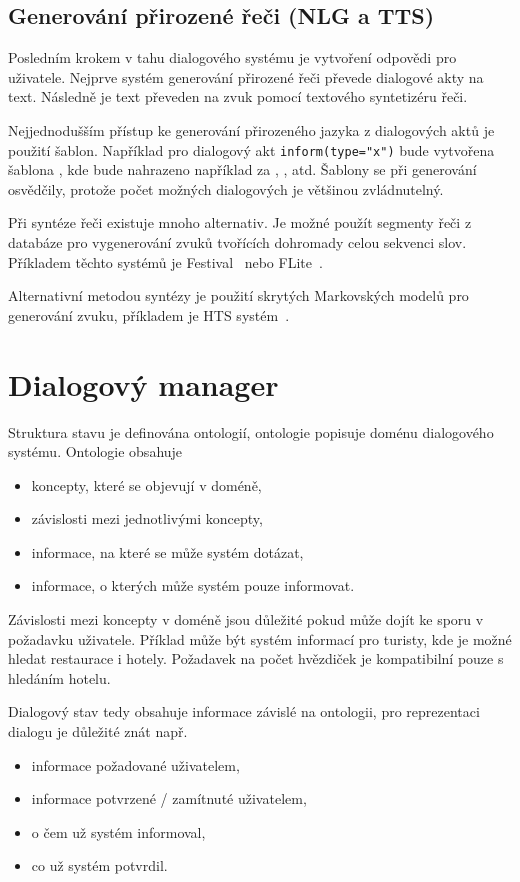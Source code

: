 \subsection{Generování přirozené řeči (NLG a TTS)}

Posledním krokem v tahu dialogového systému je vytvoření odpovědi pro uživatele. 
Nejprve systém generování přirozené řeči převede dialogové akty na text. 
Následně je text převeden na zvuk pomocí textového syntetizéru řeči.

Nejjednodušším přístup ke generování přirozeného jazyka z dialogových aktů je použití šablon.
Například pro dialogový akt {\tt inform(type="x")} bude vytvořena šablona , kde  bude nahrazeno například za , , atd. 
Šablony se při generování osvědčily, protože počet možných dialogových je většinou zvládnutelný.

Při syntéze řeči existuje mnoho alternativ. 
Je možné použít segmenty řeči z databáze pro vygenerování zvuků tvořících dohromady celou sekvenci slov.
Příkladem těchto systémů je Festival~\cite{black2001festival} nebo FLite~\cite{black2001flite}.

Alternativní metodou syntézy je použití skrytých Markovských modelů pro generování zvuku, příkladem je HTS systém~\cite{zen2007hmm}.

\section{Dialogový manager}

Struktura stavu je definována ontologií, ontologie popisuje doménu dialogového systému. 
Ontologie obsahuje
\begin{itemize}
\item koncepty, které se objevují v doméně,
\item závislosti mezi jednotlivými koncepty,
\item informace, na které se může systém dotázat,
\item informace, o kterých může systém pouze informovat.
\end{itemize}

Závislosti mezi koncepty v doméně jsou důležité pokud může dojít ke sporu v požadavku uživatele. 
Příklad může být systém informací pro turisty, kde je možné hledat restaurace i hotely. 
Požadavek na počet hvězdiček je kompatibilní pouze s hledáním hotelu.

Dialogový stav tedy obsahuje informace závislé na ontologii, pro reprezentaci dialogu je důležité znát např.
\begin{itemize}
\item informace požadované uživatelem,
\item informace potvrzené / zamítnuté uživatelem,
\item o čem už systém informoval,
\item co už systém potvrdil.
\end{itemize}

